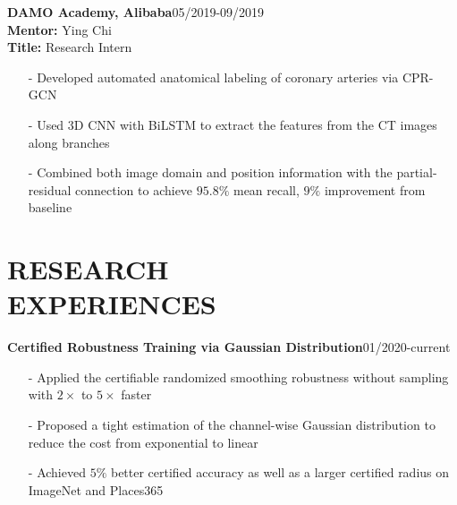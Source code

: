 \documentclass[margin]{res}
\begin{document}
\begin{resume}
                \textbf{DAMO Academy, Alibaba}\hfill 05/2019-09/2019\\
                \textbf{Mentor:} Ying Chi\\
                \textbf{Title:} Research Intern
                \begin{itemize}\itemsep -2.2pt %
                 \item[-] Developed automated anatomical labeling of coronary arteries via CPR-GCN
                 \item[-] Used 3D CNN with BiLSTM to extract the features from the CT images along branches
                 \item[-] Combined both image domain and position information with the partial-residual connection to achieve $95.8\%$ mean recall, $9\%$ improvement from baseline
                 \end{itemize}

\vspace{-1em}
\section{RESEARCH \\ EXPERIENCES}
                \textbf{Certified Robustness Training via Gaussian Distribution}\hfill 01/2020-current
                \begin{itemize}\itemsep -2.2pt %
                 \item[-] Applied the certifiable randomized smoothing robustness without sampling with $2\times$ to $5\times$ faster
                 \item[-] Proposed a tight estimation of the channel-wise Gaussian distribution to reduce the cost from exponential to linear
                 \item[-] Achieved $5\%$ better certified accuracy as well as a larger certified radius on ImageNet and Places365
                 \end{itemize}


\end{resume}
\end{document}
